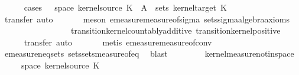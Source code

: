 \begin{isabellebody}
\ \ \ \ \isamarkupfalse%
\ {\isacharparenleft}{\kern0pt}cases\ {\isachardoublequoteopen}{\isasymomega}\ {\isasymin}\ space\ {\isacharparenleft}{\kern0pt}kernel{\isacharunderscore}{\kern0pt}source\ K{\isacharparenright}{\kern0pt}\ {\isasymand}\ A{\isacharprime}{\kern0pt}\ {\isasymin}\ sets\ {\isacharparenleft}{\kern0pt}kernel{\isacharunderscore}{\kern0pt}target\ K{\isacharparenright}{\kern0pt}{\isachardoublequoteclose}{\isacharparenright}{\kern0pt}\isanewline
\ \ \ \ \ \isamarkupfalse%
\ {\isacharparenleft}{\kern0pt}transfer{\isacharcomma}{\kern0pt}\ auto{\isacharparenright}{\kern0pt}{\isacharbrackleft}{\kern0pt}{}{\isacharbrackright}{\kern0pt}\isanewline
\ \ \ \ \ \isamarkupfalse%
\ {\isacharparenleft}{\kern0pt}meson\ emeasure{\isacharunderscore}{\kern0pt}measure{\isacharunderscore}{\kern0pt}of{\isacharunderscore}{\kern0pt}sigma\ sets{\isachardot}{\kern0pt}sigma{\isacharunderscore}{\kern0pt}algebra{\isacharunderscore}{\kern0pt}axioms\isanewline
\ \ \ \ \ \ \ \ \ \ \ \ \ \ \ \ \ transition{\isacharunderscore}{\kern0pt}kernel{\isachardot}{\kern0pt}countably{\isacharunderscore}{\kern0pt}additive\ transition{\isacharunderscore}{\kern0pt}kernel{\isachardot}{\kern0pt}positive{\isacharparenright}{\kern0pt}\isanewline
\ \ \ \ \isamarkupfalse%
\ {\isacharparenleft}{\kern0pt}transfer{\isacharcomma}{\kern0pt}\ auto{\isacharparenright}{\kern0pt}\isanewline
\ \ \ \ \ \isamarkupfalse%
\ {\isacharparenleft}{\kern0pt}metis\ emeasure{\isacharunderscore}{\kern0pt}measure{\isacharunderscore}{\kern0pt}of{\isacharunderscore}{\kern0pt}conv{\isacharparenright}{\kern0pt}\isanewline
\ \ \ \ \isamarkupfalse%
\ emeasure{\isacharunderscore}{\kern0pt}neq{\isacharunderscore}{\kern0pt}{}{\isacharunderscore}{\kern0pt}sets\ sets{\isachardot}{\kern0pt}sets{\isacharunderscore}{\kern0pt}measure{\isacharunderscore}{\kern0pt}of{\isacharunderscore}{\kern0pt}eq\ \isamarkupfalse%
\ blast\isanewline
\ \ \ \ \isamarkupfalse%
\isanewline
\ \ \isamarkupfalse%
%
\endisatagproof
{\isafoldproof}%
%
\isadelimproof
\isanewline
%
\endisadelimproof
\isanewline
{}\isamarkupfalse%
\ kernel{\isacharunderscore}{\kern0pt}measure{\isacharunderscore}{\kern0pt}notin{\isacharunderscore}{\kern0pt}space{\isacharcolon}{\kern0pt}\isanewline
\ \ \ {\isachardoublequoteopen}{\isasymomega}\ {\isasymnotin}\ space\ {\isacharparenleft}{\kern0pt}kernel{\isacharunderscore}{\kern0pt}source\ K{\isacharparenright}{\kern0pt}{\isachardoublequoteclose}\isanewline

\end{isabellebody}
